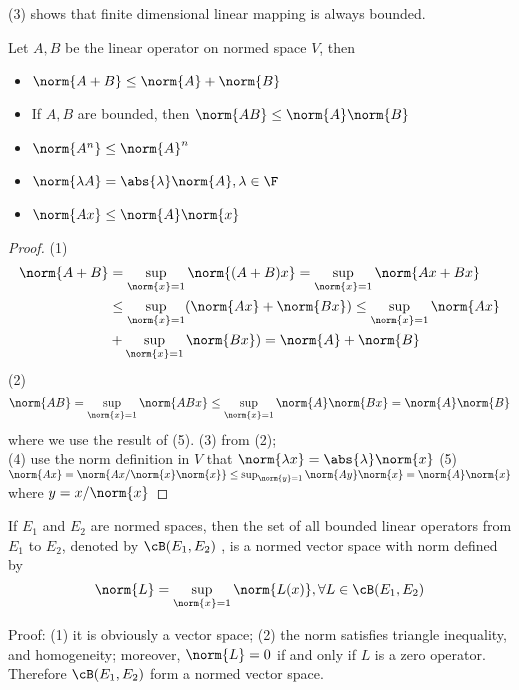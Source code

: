 \begin{refsection}
\begin{remark}
(3) shows that finite dimensional linear mapping is always bounded.
\end{remark}


\begin{lemma}\label{ch:functional-analysis:th:operatornormproperties}
\cite[143]{debnath2005hilbert}Let $A,B$ be the linear operator on normed space $V$, then
\begin{itemize}
    \item $\norm{A+B} \leq \norm{A} + \norm{B}$
    \item If $A,B$ are bounded, then $\norm{AB}\leq \norm{A}\norm{B}$
    \item $\norm{A^n} \leq \norm{A}^n$
    \item $\norm{\lambda A} = \abs{\lambda}\norm{A},\lambda\in \F$
    \item $\norm{Ax} \leq \norm{A}\norm{x}$
\end{itemize}
\end{lemma}
\begin{proof}
 (1) 
\begin{align*}
\norm{A+B} &= \sup_{\norm{x}=1}\norm{(A+B)x} = \sup_{\norm{x}=1}\norm{Ax + Bx} \\
& \leq \sup_{\norm{x}=1}(\norm{Ax} + \norm{Bx}) \leq  \sup_{\norm{x}=1}\norm{Ax}\\
& + \sup_{\norm{x}=1}\norm{Bx}) = \norm{A} + \norm{B} 
\end{align*}
(2) 
$$\norm{AB} = \sup_{\norm{x}=1}\norm{ABx} \leq \sup_{\norm{x}=1}\norm{A}\norm{Bx} = \norm{A}\norm{B}$$
where we use the result of (5).
(3) from (2);\\
(4) use the norm definition in $V$ that $\norm{\lambda x} = \abs{\lambda}\norm{x}$
(5) $\norm{Ax} = \norm{Ax/\norm{x} \norm{x}} \leq \sup_{\norm{y}=1} \norm{Ay}\norm{x}=\norm{A}\norm{x}$ 
where $y = x/\norm{x}$	
\end{proof}



\begin{theorem}
\cite[23]{debnath2005hilbert} If $E_1$ and $E_2$ are normed spaces, then the set of all bounded linear operators from $E_1$ to $E_2$, denoted by $\cB(E_1,E_2)$
, is a normed vector space with norm defined by
$$\norm{L} = \sup_{\norm{x}=1}\norm{L(x)},\forall L\in \cB(E_1,E_2)$$
\end{theorem}
Proof: (1) it is obviously a vector space; (2) the norm satisfies triangle inequality, and homogeneity; moreover, $\norm{L} = 0$ if and only if $L$ is a zero operator. Therefore $\cB(E_1,E_2)$ form a normed vector space.



\end{refsection}
